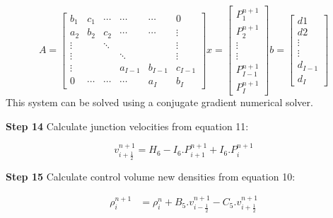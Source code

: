 \documentclass[11pt,letterpaper,titlepage]{article}
\newcommand{\half}{\frac{1}{2}}
\begin{document}
\begin{equation*}
A=
\begin{bmatrix}
b_1    & c_1     & \cdots & \cdots & \cdots & 0      \\
a_2    & b_2     & c_2    & \cdots & \cdots & \vdots \\
\vdots &         & \ddots &        &        & \vdots \\
\vdots &         &        & \ddots &        & \vdots \\
\vdots &         &        &a_{I-1} &b_{I-1} &c_{I-1}  \\
0      & \cdots  & \cdots & \cdots & a_I    & b_I 
\end{bmatrix}
x=
\begin{bmatrix}
P_1^{n+1} \\
P_2^{n+1} \\
\vdots \\
\vdots \\
P_{I-1}^{n+1} \\
P_I^{n+1} 
\end{bmatrix}
b=
\begin{bmatrix}
d1 \\
d2 \\
\vdots \\
\vdots \\
d_{I-1}\\
d_I
\end{bmatrix}
\end{equation*}
\newline
This system can be solved using a conjugate gradient numerical solver.


\newpage
\noindent
\textbf{Step 14}\newline
Calculate junction velocities from equation 11:

\begin{equation*}
v_{i+\half}^{n+1}=H_6-I_6.P_{i+1}^{n+1}+I_6.P_{i}^{n+1}
\end{equation*}







\vspace{0.5cm}\noindent
\textbf{Step 15}\newline
Calculate control volume new densities from equation 10:

\begin{equation*}
\begin{aligned}
\rho_i^{n+1}&=\rho_i^{n}+B_5.v_{i-\half}^{n+1} - C_5.v_{i+\half}^{n+1}\\
\end{aligned}
\end{equation*}
\end{document}
